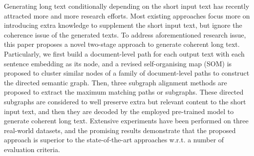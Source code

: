 Generating long text conditionally depending on the short input text has recently attracted more and more research efforts. Most existing approaches focus more on introducing extra knowledge to supplement the short input text, but ignore the coherence issue of the generated texts. To address aforementioned research issue, this paper proposes a novel two-stage approach to generate coherent long text. Particularly, we first build a document-level path for each output text with each sentence embedding as its node, and a revised self-organising map (SOM) is proposed to cluster similar nodes of a family of document-level paths to construct the directed semantic graph. Then, three subgraph alignment methods are proposed to extract the maximum matching paths or subgraphs. These directed subgraphs are considered to well preserve extra but relevant content to the short input text, and then they are decoded by the employed pre-trained model to generate coherent long text. Extensive experiments have been performed on three real-world datasets, and the promising results demonstrate that the proposed approach is superior to the state-of-the-art approaches w.r.t. a number of evaluation criteria.
